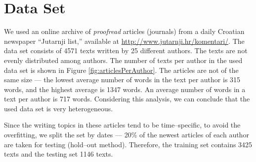 \documentclass{llncs}
\begin{document}
\section{Data Set}
\label{sec:podatci}
We used an online archive of \emph{proofread} articles (journals) from a daily
Croatian newspaper ``Jutarnji list,'' available at
\url{http://www.jutarnji.hr/komentari/}. The data set consists of 4571 texts
written by 25 different authors. The texts are not evenly distributed
among authors. The number of texts per author in the used data set is shown in
Figure \ref{fig:articlesPerAuthor}. The articles are not of the same size --- the 
lowest average number of words in the text per author is 315 words, and
the highest average is 1347 words. An average number of words in a text per author is 717 words.
Considering this analysis, we can conclude that the used data set is very
heterogeneous.

Since the writing topics in these articles tend to be time--specific, to avoid the
overfitting, we split the set by dates --- 20\% of the newest articles of each author are
taken for testing (hold--out method). Therefore, the training set contains 3425 texts
and the testing set 1146 texts.

\begin{minipage}{0.8\linewidth}
\vspace{10pt}
\centerline{\resizebox{0.7\linewidth}{!}{}}%
%
\label{fig:articlesPerAuthor}
\end{minipage}
\end{document}
